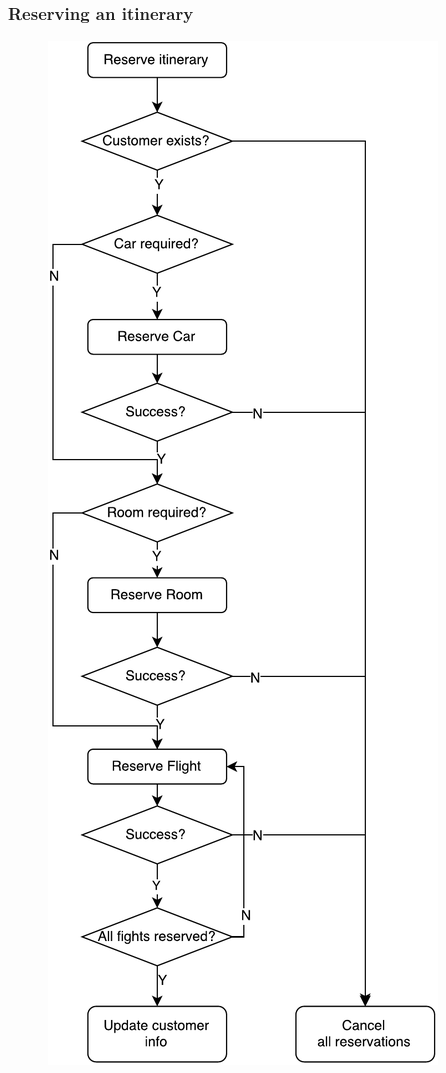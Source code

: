 \documentclass[10pt]{beamer}
\begin{document}
\begin{frame}
\frametitle{Reserving an itinerary}
\begin{figure}
\centering
\includegraphics[scale=0.25]{figures/res-itin.pdf}
\end{figure}
\end{frame}
\end{document}
